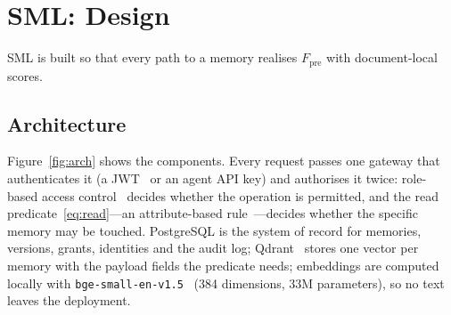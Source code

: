 \documentclass[11pt,a4paper]{article}
\theoremstyle{remark}
\newcommand{\sys}{SML}
\begin{document}
\section{\sys{}: Design}
\label{sec:design}

\sys{} is built so that every path to a memory realises $F_{\mathrm{pre}}$ with document-local scores.

\subsection{Architecture}

Figure~\ref{fig:arch} shows the components. Every request passes one gateway that authenticates it (a
JWT~\cite{rfc7519} or an agent API key) and authorises it twice: role-based access control~\cite{sandhu1996rbac}
decides whether the operation is permitted, and the read predicate~\eqref{eq:read}---an attribute-based
rule~\cite{hu2014abac}---decides whether the specific memory may be touched. PostgreSQL is the system of
record for memories, versions, grants, identities and the audit log; Qdrant~\cite{qdrant2024} stores one vector
per memory with the payload fields the predicate needs; embeddings are computed locally with
\texttt{bge-small-en-v1.5}~\cite{xiao2023cpack} (384 dimensions, 33M parameters), so no text leaves the deployment.
\end{document}
